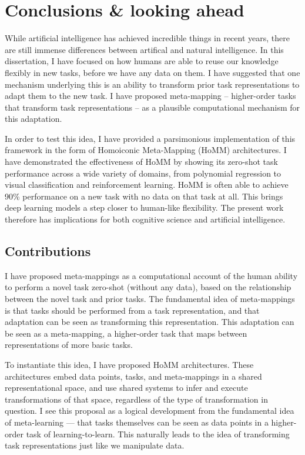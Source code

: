 \chapter{Conclusions \& looking ahead} \label{chapter:conclusions}

While artificial intelligence has achieved incredible things in recent years, there are still immense differences between artifical and natural intelligence. In this dissertation, I have focused on how humans are able to reuse our knowledge flexibly in new tasks, before we have any data on them. I have suggested that one mechanism underlying this is an ability to transform prior task representations to adapt them to the new task. I have proposed meta-mapping -- higher-order tasks that transform task representations -- as a plausible computational mechanism for this adaptation. \par
In order to test this idea, I have provided a parsimonious implementation of this framework in the form of Homoiconic Meta-Mapping (HoMM) architectures. I have demonstrated the effectiveness of HoMM by showing its zero-shot task performance across a wide variety of domains, from polynomial regression to visual classification and reinforcement learning. HoMM is often able to achieve 90\% performance on a new task with no data on that task at all. This brings deep learning models a step closer to human-like flexibility. The present work therefore has implications for both cognitive science and artificial intelligence. \par  

\section{Contributions}

I have proposed meta-mappings as a computational account of the human ability to perform a novel task zero-shot (without any data), based on the relationship between the novel task and prior tasks. The fundamental idea of meta-mappings is that tasks should be performed from a task representation, and that adaptation can be seen as transforming this representation. This adaptation can be seen as a meta-mapping, a higher-order task that maps between representations of more basic tasks. \par  

To instantiate this idea, I have proposed HoMM architectures. These architectures embed data points, tasks, and meta-mappings in a shared representational space, and use shared systems to infer and execute transformations of that space, regardless of the type of transformation in question. I see this proposal as a logical development from the fundamental idea of meta-learning --- that tasks themselves can be seen as data points in a higher-order task of learning-to-learn. This naturally leads to the idea of transforming task representations just like we manipulate data. \par  

